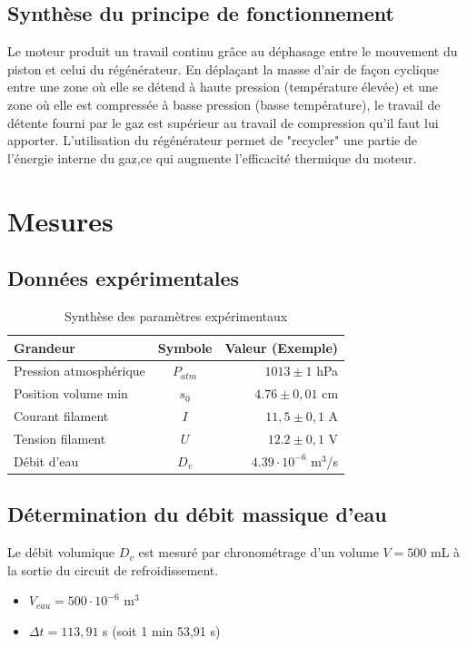 \documentclass[a4paper,9pt,french]{scrartcl}
\begin{document}
\subsection{Synthèse du principe de fonctionnement}
Le moteur produit un travail continu grâce au déphasage entre le mouvement du piston et celui du régénérateur. En déplaçant la masse d'air de façon cyclique entre une zone où elle se détend à haute pression (température élevée) et une zone où elle est compressée à basse pression (basse température), le travail de détente fourni par le gaz est supérieur au travail de compression qu'il faut lui apporter. L'utilisation du régénérateur  
permet de "recycler" une partie de l'énergie interne du gaz,ce qui augmente l'efficacité thermique du moteur.
\section{Mesures}
\subsection{Données expérimentales}
\begin{table}[H]
\centering
\begin{tabular}{|l|c|r|}
\hline
Grandeur & Symbole & Valeur (Exemple) \\ \hline
Pression atmosphérique & $P_{atm}$ & $1013 \pm 1$ hPa \\
Position volume min & $s_0$ & $4.76 \pm 0,01$ cm \\
Courant filament & $I$ & $11,5 \pm 0,1$ A \\
Tension filament & $U$ & $12.2 \pm 0,1$ V \\
Débit d'eau & $D_v$ & $4.39 \cdot 10^{-6}$ m$^3$/s \\
\hline
\end{tabular}
\caption{Synthèse des paramètres expérimentaux}
\end{table}
\subsection{Détermination du débit massique d'eau}
Le débit volumique $D_v$ est mesuré par chronométrage d'un volume $V = 500$ mL à la sortie du circuit de refroidissement. 

\begin{itemize}
    \item $V_{eau} = 500 \cdot 10^{-6}$ m$^3$ 
    \item $\Delta t = 113,91$ s (soit 1 min 53,91 s)
\end{itemize}
\end{document}
